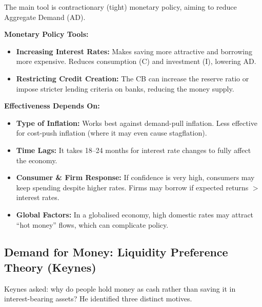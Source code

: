 \documentclass[11pt, a4paper, twoside]{book}
\begin{document}
The main tool is contractionary (tight) monetary policy, aiming to reduce Aggregate Demand (AD).

\textbf{Monetary Policy Tools:}
\begin{itemize}
  \item \textbf{Increasing Interest Rates:} Makes saving more attractive and borrowing more expensive. Reduces consumption (C) and investment (I), lowering AD.
  \item \textbf{Restricting Credit Creation:} The CB can increase the reserve ratio or impose stricter lending criteria on banks, reducing the money supply.
\end{itemize}

\textbf{Effectiveness Depends On:}
\begin{itemize}
  \item \textbf{Type of Inflation:} Works best against demand-pull inflation. Less effective for cost-push inflation (where it may even cause stagflation).
  \item \textbf{Time Lags:} It takes 18--24 months for interest rate changes to fully affect the economy.
  \item \textbf{Consumer \& Firm Response:} If confidence is very high, consumers may keep spending despite higher rates. Firms may borrow if expected returns $>$ interest rates.
  \item \textbf{Global Factors:} In a globalised economy, high domestic rates may attract ``hot money'' flows, which can complicate policy.
\end{itemize}

\subsection{Demand for Money: Liquidity Preference Theory (Keynes)}

Keynes asked: why do people hold money as cash rather than saving it in interest-bearing assets? He identified three distinct motives.
\end{document}
